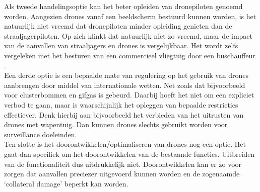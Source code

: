 Als tweede handelingsoptie kan het beter opleiden van dronepiloten genoemd worden. Aangezien drones vanaf een beeldscherm bestuurd kunnen worden, is het natuurlijk niet vreemd dat dronepiloten minder opleiding genieten dan de straaljagerpiloten. Op zich klinkt dat natuurlijk niet zo vreemd, maar de impact van de aanvallen van straaljagers en drones is vergelijkbaar. Het wordt zelfs vergeleken met het besturen van een commercieel vliegtuig door een buschauffeur \cite{ethical_analysis}.\\

Een derde optie is een bepaalde mate van regulering op het gebruik van drones aanbrengen door middel van internationale wetten. Net zoals dat bijvoorbeeld voor clusterbommen en gifgas is gebeurd. Daarbij hoeft het niet om een expliciet verbod te gaan, maar is waarschijnlijk het opleggen van bepaalde restricties effectiever. Denk hierbij aan bijvoorbeeld het verbieden van het uitrusten van drones met wapentuig. Dan kunnen drones slechts gebruikt worden voor surveillance doeleinden.\\

Ten slotte is het doorontwikkelen/optimaliseren van drones nog een optie. Het gaat dan specifiek om het doorontwikkelen van de bestaande functies. Uitbreiden van de functionaliteit dus uitdrukkelijk niet. Doorontwikkelen kan er zo voor zorgen dat aanvallen preciezer uitgevoerd kunnen worden en de zogenaamde `collateral damage' beperkt kan worden.\\


